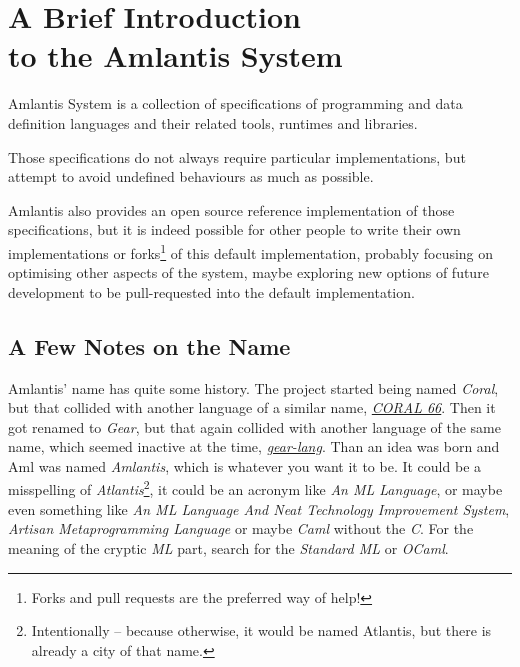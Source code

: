 
\chapter[A Brief Introduction to the Amlantis System]{A Brief Introduction \\ to the Amlantis System}
\label{sec:brief-intro}

Amlantis System is a collection of specifications of programming and data definition languages and their related tools, runtimes and libraries. 

Those specifications do not always require particular implementations, but attempt to avoid undefined behaviours as much as possible. 

Amlantis also provides an open source reference implementation of those specifications, but it is indeed possible for other people to write their own implementations or forks\footnote{Forks and pull requests are the preferred way of help!} of this default implementation, probably focusing on optimising other aspects of the system, maybe exploring new options of future development to be pull-requested into the default implementation. 





\section*{A Few Notes on the Name}

Amlantis' name has quite some history. The project started being named {\em Coral}, but that collided with another language of a similar name, \href{https://en.wikipedia.org/wiki/Coral_66}{{\em CORAL 66}}. Then it got renamed to {\em Gear}, but that again collided with another language of the same name, which seemed inactive at the time, \href{https://github.com/gear-lang}{{\em gear-lang}}. Than an idea was born and Aml was named {\em Amlantis}, which is whatever you want it to be. It could be a misspelling of {\em Atlantis}\footnote{Intentionally -- because otherwise, it would be named Atlantis, but there is already a city of that name.}, it could be an acronym like {\em An ML Language}, or maybe even something like {\em An ML Language And Neat Technology Improvement System}, {\em Artisan Metaprogramming Language} or maybe {\em Caml} without the {\em C}. For the meaning of the cryptic {\em ML} part, search for the {\em Standard ML} or {\em OCaml}. 





